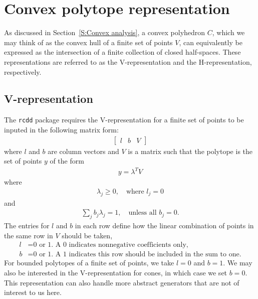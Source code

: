 \section{Convex polytope representation}
As discussed in Section~\ref{S:Convex analysis}, a convex polyhedron $C$, which we 
may think of as the convex hull of a finite set of points $V$, can equivalently
be expressed as the intersection of a finite collection of closed half-spaces.  These
representations are referred to as the V-representation and the H-representation, 
respectively.

\subsection{V-representation} \label{S:V-rep}
The \texttt{rcdd} package requires the V-representation for a finite set of points 
to be inputed in the following matrix form:
\begin{align} \label{E:V-rep}
	\left[\begin{array}{ccc}l & b & V\end{array}\right]
\end{align}
where $l$ and $b$ are column vectors and $V$ is a matrix such that the polytope
is the set of points $y$ of the form
\begin{align*}
	y = \lambda^T V
\end{align*}
where
\begin{align*}
	\lambda_j \geq 0, \quad \text{where $l_j = 0$}
\end{align*}
and 
\begin{align*}
	\sum_j b_j \lambda_j = 1, \quad \text{unless all $b_j = 0$.}
\end{align*}
The entries for $l$ and $b$ in each row define how the linear combination of 
points in the same row in $V$ should be taken,
\begin{align*}
	l &= \text{0 or 1.  A 0 indicates nonnegative coefficients only,}\\
	b &= \text{0 or 1.  A 1 indicates this row should be included in the sum to one.}
\end{align*}
For bounded polytopes of a finite set of points, we take $l = 0$ and $b = 1$.  
We may also be interested in the V-representation for cones, in 
which case we set $b=0$.  
This representation can also handle more abstract generators that 
are not of interest to us here.


